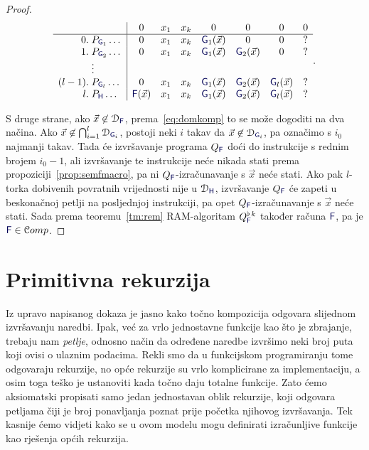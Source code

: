 \begin{proof}
\begin{equation}
\begin{array}{r@{\;}l|ccccccc}
      &               & 0          &x_1  &x_k    &0             &0             &0             &0            \\\hline
0.    &P_{\f G_1}\dots& 0          &x_1  &x_k    &\f G_1(\vec x)&0             &0             &?            \\
1.    &P_{\f G_2}\dots& 0          &x_1  &x_k    &\f G_1(\vec x)&\f G_2(\vec x)&0             &?            \\
      &\vdots                                                                                               \\
(l-1).&P_{\f G_l}\dots& 0          &x_1  &x_k    &\f G_1(\vec x)&\f G_2(\vec x)&\f G_l(\vec x)&?            \\
l.    &P_{\f H}\dots  &\f F(\vec x)&x_1  &x_k    &\f G_1(\vec x)&\f G_2(\vec x)&\f G_l(\vec x)&?
    \end{array}\text.
\end{equation}

S druge strane, ako $\vec x\not\in\dom{\f F}$, prema~\eqref{eq:domkomp} to se može dogoditi na dva načina. Ako $\vec x\not\in\bigcap_{i=1}^l\dom{\f G_i}$, postoji neki $i$ takav da $\vec x\not\in\dom{\f G_i}$, pa označimo s $i_0$ najmanji takav. Tada će izvršavanje programa $Q_{\f F}$ doći do instrukcije s rednim brojem $i_0-1$, ali izvršavanje te instrukcije neće nikada stati prema propoziciji~\ref{prop:semfmacro}, pa ni $Q_{\f F}$-izračunavanje s $\vec x$ neće stati. Ako pak $l$-torka dobivenih povratnih vrijednosti nije u $\dom{\f H}$, izvršavanje $Q_{\f F}$ će zapeti u beskonačnoj petlji na posljednjoj instrukciji, pa opet $Q_{\f F}$-izračunavanje s $\vec x$ neće stati.
Sada prema teoremu~\ref{tm:rem} RAM-algoritam $Q_{\f F}^{\flat\,k}$ također računa $\f F$, pa je $\f F\in\mathcal Comp$.
\end{proof}

\section{Primitivna rekurzija}

Iz upravo napisanog dokaza je jasno kako točno kompozicija odgovara slijednom iz\-vrša\-va\-nju naredbi. Ipak, već za vrlo jednostavne funkcije kao što je zbrajanje, trebaju nam \emph{petlje}, odnosno način da određene naredbe izvršimo neki broj puta koji ovisi o ulaznim podacima. Rekli smo da u funkcijskom programiranju tome odgovaraju rekurzije, no opće rekurzije su vrlo komplicirane za implementaciju, a osim toga teško je ustanoviti kada točno daju totalne funkcije. Zato ćemo aksiomatski propisati samo jedan  jednostavan oblik rekurzije, koji odgovara petljama čiji je broj ponavljanja poznat prije početka njihovog izvršavanja. Tek kasnije ćemo vidjeti kako se u ovom modelu mogu definirati izračunljive funkcije kao rješenja općih rekurzija.

